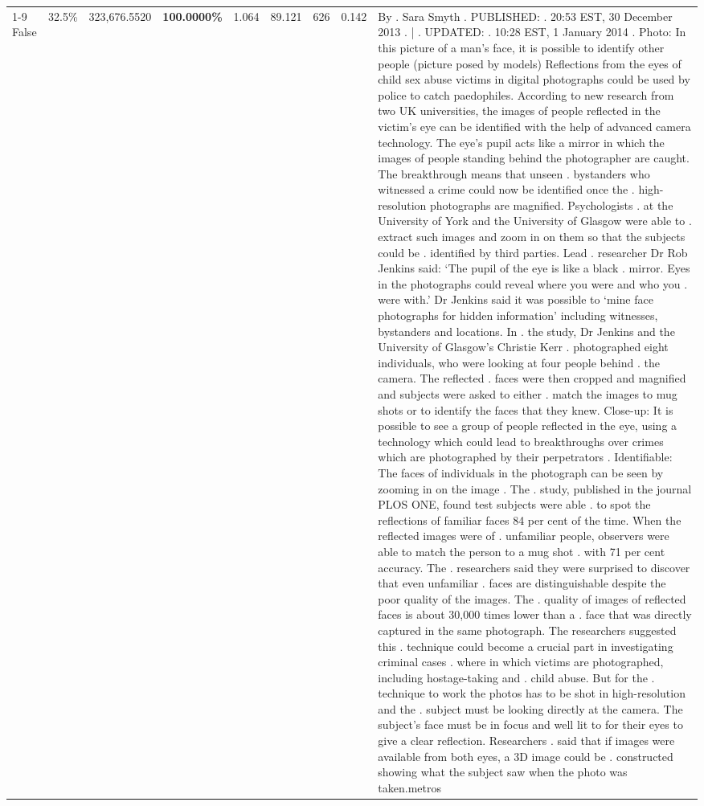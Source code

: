 \begin{table}[H]
\begin{tabular}{lllrlllll}
\cline{1-9} \cline{2-9}
False & 32.5\% & 323,676.5520 & \bfseries \color{red} 100.0000\% & 1.064 & 89.121 & 626 & 0.142 & By . Sara Smyth . PUBLISHED: . 20:53 EST, 30 December 2013 . | . UPDATED: . 10:28 EST, 1 January 2014 . Photo: In this picture of a man's face, it is possible to identify other people (picture posed by models) Reflections from the eyes of child sex abuse victims in digital photographs could be used by police to catch paedophiles. According to new research from two UK universities, the images of people reflected in the victim's eye can be identified with the help of advanced camera technology. The eye's pupil acts like a mirror in which the images of people standing behind the photographer are caught. The breakthrough means that unseen . bystanders who witnessed a crime could now be identified once the . high-resolution photographs are magnified. Psychologists . at the University of York and the University of Glasgow were able to . extract such images and zoom in on them so that the subjects could be . identified by third parties. Lead . researcher Dr Rob Jenkins said: ‘The pupil of the eye is like a black . mirror. Eyes in the photographs could reveal where you were and who you . were with.' Dr Jenkins said it was possible to ‘mine face photographs for hidden information' including witnesses, bystanders and locations. In . the study, Dr Jenkins and the University of Glasgow's Christie Kerr . photographed eight individuals, who were looking at four people behind . the camera. The reflected . faces were then cropped and magnified and subjects were asked to either . match the images to mug shots or to identify the faces that they knew. Close-up: It is possible to see a group of people reflected in the eye, using a technology which could lead to breakthroughs over crimes which are photographed by their perpetrators . Identifiable: The faces of individuals in the photograph can be seen by zooming in on the image . The . study, published in the journal PLOS ONE, found test subjects were able . to spot the reflections of familiar faces 84 per cent of the time. When the reflected images were of . unfamiliar people, observers were able to match the person to a mug shot . with 71 per cent accuracy. The . researchers said they were surprised to discover that even unfamiliar . faces are distinguishable despite the poor quality of the images. The . quality of images of reflected faces is about 30,000 times lower than a . face that was directly captured in the same photograph. The researchers suggested this . technique could become a crucial part in investigating criminal cases . where in which victims are photographed, including hostage-taking and . child abuse. But for the . technique to work the photos has to be shot in high-resolution and the . subject must be looking directly at the camera. The subject's face must be in focus and well lit to for their eyes to give a clear reflection. Researchers . said that if images were available from both eyes, a 3D image could be . constructed showing what the subject saw when the photo was taken.metros \\

\end{tabular}
\end{table}
